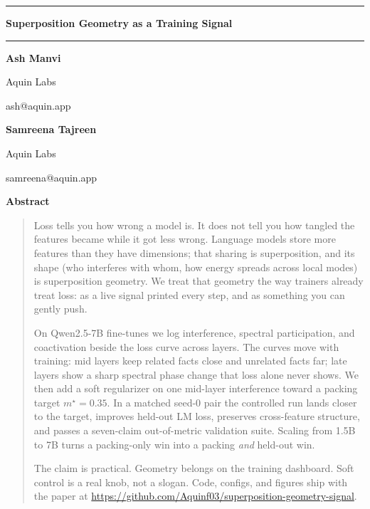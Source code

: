 \documentclass[11pt]{article}
\begin{document}
\thispagestyle{empty}
\vspace*{0.5cm}

\noindent\rule{\textwidth}{2pt}

\vspace{0.45cm}
\begin{center}
  {\LARGE\bfseries Superposition Geometry as a Training Signal}
\end{center}
\vspace{0.35cm}

\noindent\rule{\textwidth}{0.8pt}

\vspace{0.6cm}

\begin{center}
\begin{minipage}[t]{0.3\textwidth}
\centering
{\bfseries Ash Manvi}\par
Aquin Labs\par
{\ttfamily ash@aquin.app}
\end{minipage}
\hfill
\begin{minipage}[t]{0.3\textwidth}
\centering
{\bfseries Samreena Tajreen}\par
Aquin Labs\par
{\ttfamily samreena@aquin.app}
\end{minipage}
\end{center}

\vspace{0.55cm}

\begin{center}
  {\Large\bfseries Abstract}
\end{center}

\begin{quote}
Loss tells you how wrong a model is. It does not tell you how tangled the
features became while it got less wrong. Language models store more features
than they have dimensions; that sharing is superposition, and its shape
(who interferes with whom, how energy spreads across local modes) is
superposition geometry. We treat that geometry the way trainers already treat
loss: as a live signal printed every step, and as something you can gently
push.

On Qwen2.5-7B fine-tunes we log interference, spectral participation, and
coactivation beside the loss curve across layers. The curves move with
training: mid layers keep related facts close and unrelated facts far; late
layers show a sharp spectral phase change that loss alone never shows. We then
add a soft regularizer on one mid-layer interference toward a packing target
$m^\star{=}0.35$. In a matched seed-0 pair the controlled run lands closer to
the target, improves held-out LM loss, preserves cross-feature structure, and
passes a seven-claim out-of-metric validation suite. Scaling from 1.5B to 7B
turns a packing-only win into a packing \emph{and} held-out win.

The claim is practical. Geometry belongs on the training dashboard. Soft
control is a real knob, not a slogan. Code, configs, and figures ship with the
paper at
\url{https://github.com/Aquinf03/superposition-geometry-signal}.
\end{quote}
\end{document}
